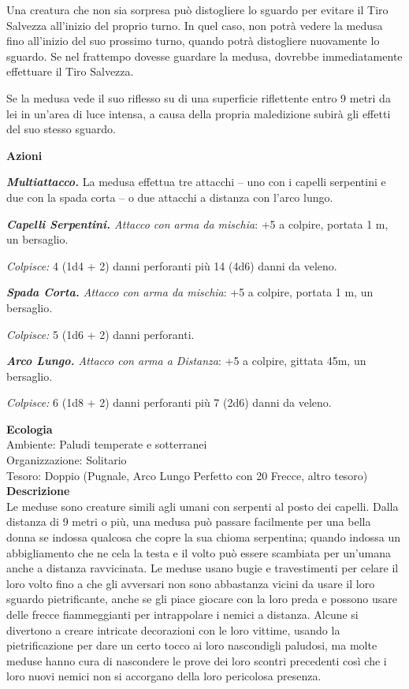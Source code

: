 \begin{multicols}{2}
Una creatura che non sia sorpresa può distogliere lo sguardo per evitare il Tiro Salvezza all'inizio del proprio turno. In quel caso, non potrà vedere la medusa fino all'inizio del suo prossimo turno, quando potrà distogliere nuovamente lo sguardo. Se nel frattempo dovesse guardare la medusa, dovrebbe immediatamente effettuare il Tiro Salvezza.

Se la medusa vede il suo riflesso su di una superficie riflettente entro 9 metri da lei in un'area di luce intensa, a causa della propria maledizione subirà gli effetti del suo stesso sguardo.

\textbf{Azioni}

\emph{\textbf{Multiattacco.}} La medusa effettua tre attacchi -- uno con i capelli serpentini e due con la spada corta -- o due attacchi a distanza con l'arco lungo.

\emph{\textbf{Capelli Serpentini.} Attacco con arma da mischia}: +5 a colpire, portata 1 m, un bersaglio.

\emph{Colpisce:} 4 (1d4 + 2) danni perforanti più 14 (4d6) danni da veleno.

\emph{\textbf{Spada Corta.} Attacco con arma da mischia}: +5 a colpire, portata 1 m, un bersaglio.

\emph{Colpisce:} 5 (1d6 + 2) danni perforanti.

\emph{\textbf{Arco Lungo.} Attacco con arma a Distanza}: +5 a colpire, gittata 45m, un bersaglio.

\emph{Colpisce:} 6 (1d8 + 2) danni perforanti più 7 (2d6) danni da veleno.

\textbf{Ecologia}\\
Ambiente: Paludi temperate e sotterranei\\
Organizzazione: Solitario\\
Tesoro: Doppio (Pugnale, Arco Lungo Perfetto con 20 Frecce, altro tesoro)\\
\textbf{Descrizione}\\
Le meduse sono creature simili agli umani con serpenti al posto dei capelli. Dalla distanza di 9 metri o più, una medusa può passare facilmente per una bella donna se indossa qualcosa che copre la sua chioma serpentina; quando indossa un abbigliamento che ne cela la testa e il volto può essere scambiata per un'umana anche a distanza ravvicinata. Le meduse usano bugie e travestimenti per celare il loro volto fino a che gli avversari non sono abbastanza vicini da usare il loro sguardo pietrificante, anche se gli piace giocare con la loro preda e possono usare delle frecce fiammeggianti per intrappolare i nemici a distanza. Alcune si divertono a creare intricate decorazioni con le loro vittime, usando la pietrificazione per dare un certo tocco ai loro nascondigli paludosi, ma molte meduse hanno cura di nascondere le prove dei loro scontri precedenti così che i loro nuovi nemici non si accorgano della loro pericolosa presenza.\\


\end{multicols}
